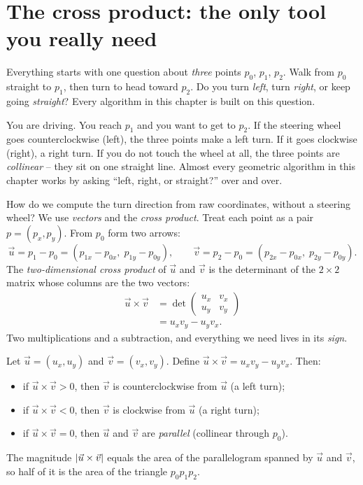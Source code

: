 \chapterline

\section{The cross product: the only tool you really need}

Everything starts with one question about \emph{three} points $p_0$, $p_1$,
$p_2$. Walk from $p_0$ straight to $p_1$, then turn to head toward $p_2$. Do you
turn \emph{left}, turn \emph{right}, or keep going \emph{straight}? Every
algorithm in this chapter is built on this question.

\begin{intuitionbox}
You are driving. You reach $p_1$ and you want to get to $p_2$. If the steering
wheel goes counterclockwise (left), the three points make a left turn. If it goes
clockwise (right), a right turn. If you do not touch the wheel at all, the three
points are \emph{collinear} -- they sit on one straight line. Almost every
geometric algorithm in this chapter works by asking ``left, right, or straight?''
over and over.
\end{intuitionbox}

How do we compute the turn direction from raw coordinates, without a steering
wheel? We use \emph{vectors} and the \emph{cross product}. Treat each point as a
pair $p = (p_x, p_y)$. From $p_0$ form two arrows:
\[
  \vec{u} = p_1 - p_0 = (p_{1x} - p_{0x},\; p_{1y} - p_{0y}),
  \qquad
  \vec{v} = p_2 - p_0 = (p_{2x} - p_{0x},\; p_{2y} - p_{0y}).
\]
The \emph{two-dimensional cross product} of $\vec{u}$ and $\vec{v}$ is the
determinant of the $2 \times 2$ matrix whose columns are the two vectors:
\begin{align*}
  \vec{u} \times \vec{v} &= \det \begin{pmatrix} u_x & v_x \\ u_y & v_y \end{pmatrix} \\
  &= u_x v_y - u_y v_x .
\end{align*}
Two multiplications and a subtraction, and everything we need lives in its
\emph{sign}.

\begin{formalbox}
Let $\vec{u} = (u_x, u_y)$ and $\vec{v} = (v_x, v_y)$. Define
$\vec{u} \times \vec{v} = u_x v_y - u_y v_x$. Then:
\begin{itemize}
  \item if $\vec{u} \times \vec{v} > 0$, then $\vec{v}$ is counterclockwise from
        $\vec{u}$ (a left turn);
  \item if $\vec{u} \times \vec{v} < 0$, then $\vec{v}$ is clockwise from
        $\vec{u}$ (a right turn);
  \item if $\vec{u} \times \vec{v} = 0$, then $\vec{u}$ and $\vec{v}$ are
        \emph{parallel} (collinear through $p_0$).
\end{itemize}
The magnitude $\lvert\vec{u} \times \vec{v}\rvert$ equals the area of the parallelogram
spanned by $\vec{u}$ and $\vec{v}$, so half of it is the area of the triangle
$p_0 p_1 p_2$.
\end{formalbox}

